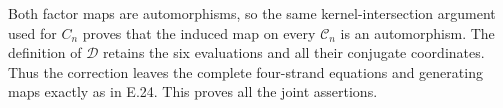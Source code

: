 Both factor maps are automorphisms, so the same
kernel-intersection argument used for $C_n$ proves
that the induced map on every $\mathscr C_n$ is an
automorphism.  The definition of $\mathscr D$ retains
the six evaluations and all their conjugate coordinates.
Thus the correction leaves the complete four-strand
equations and generating maps exactly as in E.24.
This proves all the joint assertions.
